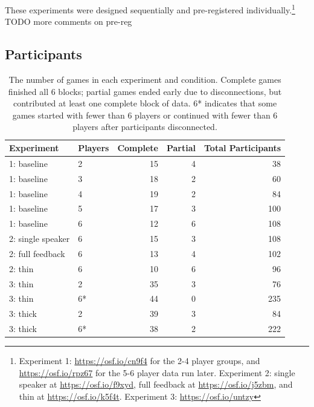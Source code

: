 \documentclass[
  english,
  a4paper,
]{article}
\begin{document}
These experiments were designed sequentially and pre-registered individually.\footnote{Experiment 1: \url{https://osf.io/cn9f4} for the 2-4 player groups, and \url{https://osf.io/rpz67} for the 5-6 player data run later. Experiment 2: single speaker at \url{https://osf.io/f9xyd}, full feedback at \url{https://osf.io/j5zbm}, and thin at \url{https://osf.io/k5f4t}. Experiment 3: \url{https://osf.io/untzy}} TODO more comments on pre-reg

\hypertarget{participants}{%
\subsection{Participants}\label{participants}}

\begin{table}

\caption{\label{tab:participants}The number of games in each experiment and condition. Complete games finished all 6 blocks; partial games ended early due to disconnections, but contributed at least one complete block of data. 6* indicates that some games started with fewer than 6 players or continued with fewer than 6 players after participants disconnected.}
\centering
\begin{tabular}[t]{l|l|r|r|r}
\hline
Experiment & Players & Complete & Partial & Total Participants\\
\hline
1: baseline & 2 & 15 & 4 & 38\\
\hline
1: baseline & 3 & 18 & 2 & 60\\
\hline
1: baseline & 4 & 19 & 2 & 84\\
\hline
1: baseline & 5 & 17 & 3 & 100\\
\hline
1: baseline & 6 & 12 & 6 & 108\\
\hline
2: single speaker & 6 & 15 & 3 & 108\\
\hline
2: full feedback & 6 & 13 & 4 & 102\\
\hline
2: thin & 6 & 10 & 6 & 96\\
\hline
3: thin & 2 & 35 & 3 & 76\\
\hline
3: thin & 6* & 44 & 0 & 235\\
\hline
3: thick & 2 & 39 & 3 & 84\\
\hline
3: thick & 6* & 38 & 2 & 222\\
\hline
\end{tabular}
\end{table}
\end{document}
